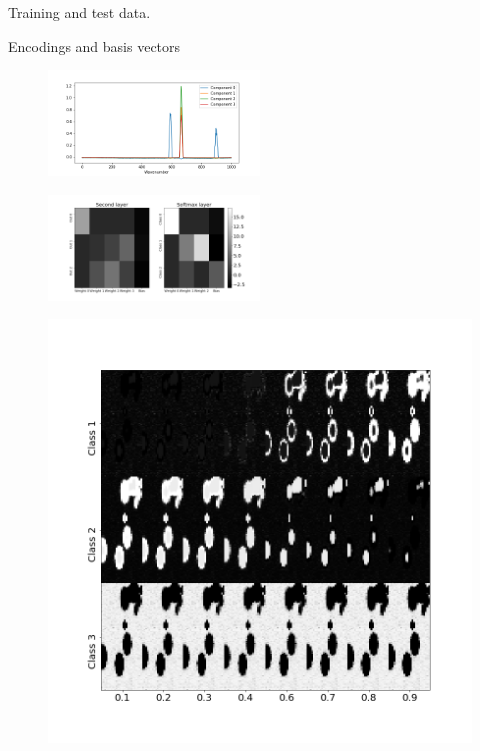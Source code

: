 \documentclass{article}
\begin{document}
Training and test data. 

Encodings and basis vectors

\begin{figure}
  \includegraphics[width=0.5\textwidth]{figures_2/raman_sim_3_encode_layer_1_finetune_13.png}
\end{figure}


\begin{figure}
  \includegraphics[width=0.5\textwidth]{figures_2/raman_sim_second_softmax_encode.png}
\end{figure}


\begin{figure}
  \includegraphics[width=1\linewidth]{figures_2/DNN_prop_im.png}
\end{figure}
\end{document}
